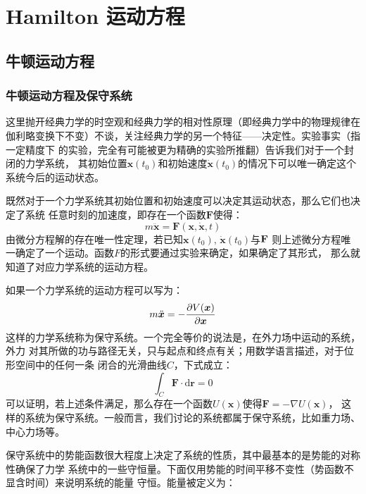 \chapter{Hamilton 运动方程}
    \section{牛顿运动方程}
    \subsection{牛顿运动方程及保守系统}
    \par
    这里抛开经典力学的时空观和经典力学的相对性原理（即经典力学中的物理规律在
    伽利略变换下不变）不谈，关注经典力学的另一个特征——决定性。实验事实（指一定精度下
    的实验，完全有可能被更为精确的实验所推翻）告诉我们对于一个封闭的力学系统，
    其初始位置$\bm{x}(t_0)$和初始速度$\dot{\bm{x}}(t_0)$的情况下可以唯一确定这个
    系统今后的运动状态。
    \par 既然对于一个力学系统其初始位置和初始速度可以决定其运动状态，那么它们也决定了系统
    任意时刻的加速度，即存在一个函数$\bm{F}$使得：
    \begin{equation}
        m\ddot{\bm{x}} = \bm{F}(\bm{x}, \dot{\bm{x}}, t)
    \end{equation}
    由微分方程解的存在唯一性定理，若已知$\bm{x}(t_0),\, \dot{\bm{x}}(t_0)$与$\mathbf{F}$
    则上述微分方程唯一确定了一个运动。函数$F$的形式要通过实验来确定，如果确定了其形式，
    那么就知道了对应力学系统的运动方程。
    \par 如果一个力学系统的运动方程可以写为：
    \begin{equation}
        m\ddot{\bm{x}} = -\frac{\partial{V(\bm{x})}}{\partial{\bm{x}}}
    \end{equation}
    这样的力学系统称为保守系统。一个完全等价的说法是，在外力场中运动的系统，外力
    对其所做的功与路径无关，只与起点和终点有关；用数学语言描述，对于位形空间中的任何一条
    闭合的光滑曲线$C$，下式成立：
    \begin{equation}
        \int_{C}\bm{F}\cdot\mathrm{d} \bm{r} = 0
    \end{equation}
    可以证明，若上述条件满足，那么存在一个函数$U(\bm{x})$使得$\bm{F} = -\nabla U(\bm{x})$，
    这样的系统为保守系统。一般而言，我们讨论的系统都属于保守系统，比如重力场、中心力场等。
    \par 
    保守系统中的势能函数很大程度上决定了系统的性质，其中最基本的是势能的对称性确保了力学
    系统中的一些守恒量。下面仅用势能的时间平移不变性（势函数不显含时间）来说明系统的能量
    守恒。能量被定义为：
